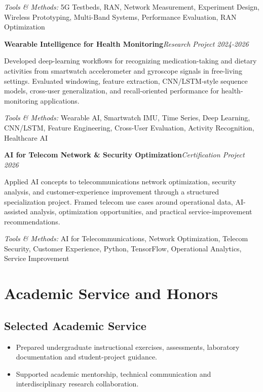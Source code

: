 \documentclass[8pt,letterpaper]{extarticle}
\newcommand{\entry}[2]{\Needspace{4\baselineskip}\textbf{#1}\hfill\textit{#2}\par}
\begin{document}
{\small\textit{Tools \& Methods:} 5G Testbeds, RAN, Network Measurement, Experiment Design, Wireless Prototyping, Multi-Band Systems, Performance Evaluation, RAN Optimization\par}
\vspace{1pt}
\entry{Wearable Intelligence for Health Monitoring}{Research Project \textbar{} 2024-2026}
Developed deep-learning workflows for recognizing medication-taking and dietary activities from smartwatch accelerometer and gyroscope signals in free-living settings. Evaluated windowing, feature extraction, CNN/LSTM-style sequence models, cross-user generalization, and recall-oriented performance for health-monitoring applications.\par
{\small\textit{Tools \& Methods:} Wearable AI, Smartwatch IMU, Time Series, Deep Learning, CNN/LSTM, Feature Engineering, Cross-User Evaluation, Activity Recognition, Healthcare AI\par}
\vspace{1pt}
\entry{AI for Telecom Network \& Security Optimization}{Certification Project \textbar{} 2026}
Applied AI concepts to telecommunications network optimization, security analysis, and customer-experience improvement through a structured specialization project. Framed telecom use cases around operational data, AI-assisted analysis, optimization opportunities, and practical service-improvement recommendations.\par
{\small\textit{Tools \& Methods:} AI for Telecommunications, Network Optimization, Telecom Security, Customer Experience, Python, TensorFlow, Operational Analytics, Service Improvement\par}
\vspace{1pt}
\section{Academic Service and Honors}
\subsection{Selected Academic Service}
\begin{itemize}
\item Prepared undergraduate instructional exercises, assessments, laboratory documentation and student-project guidance.
\item Supported academic mentorship, technical communication and interdisciplinary research collaboration.
\end{itemize}
\end{document}
